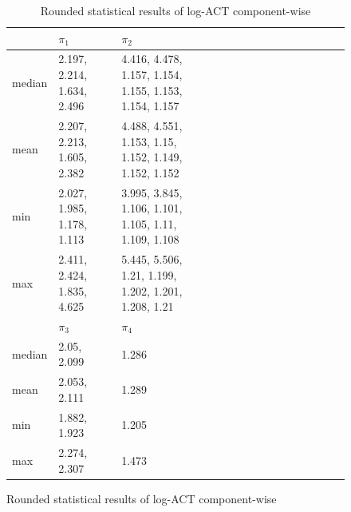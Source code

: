 \documentclass{scrartcl}
\begin{document}
    \begin{figure}[H]
        \begin{table}[H]
            \centering
            \begin{tabular}{|l|l|l|l|l|l|l|l|l|l|l|l|l|l|l|}
                \hline & $\pi_1$ & $\pi_2$ \\ \hline
                median & 2.197, 2.214, 1.634, 2.496 & 4.416, 4.478, 1.157, 1.154, 1.155, 1.153, 1.154, 1.157 \\\hline
                mean & 2.207, 2.213, 1.605, 2.382 & 4.488, 4.551, 1.153, 1.15, 1.152, 1.149, 1.152, 1.152 \\\hline
                min & 2.027, 1.985, 1.178, 1.113 & 3.995, 3.845, 1.106, 1.101, 1.105, 1.11, 1.109, 1.108 \\\hline
                max & 2.411, 2.424, 1.835, 4.625 & 5.445, 5.506, 1.21, 1.199, 1.202, 1.201, 1.208, 1.21 \\\hline
                \hline & $\pi_3$ & $\pi_4$ \\ \hline
                median & 2.05, 2.099 & 1.286 \\\hline
                mean & 2.053, 2.111 & 1.289 \\\hline
                min & 1.882, 1.923 & 1.205 \\\hline
                max & 2.274, 2.307 & 1.473 \\\hline
            \end{tabular}
            \caption{Rounded statistical results of log-ACT component-wise}
            \label{stat_results_log_act}
        \end{table}
    \end{figure}
\end{document}
